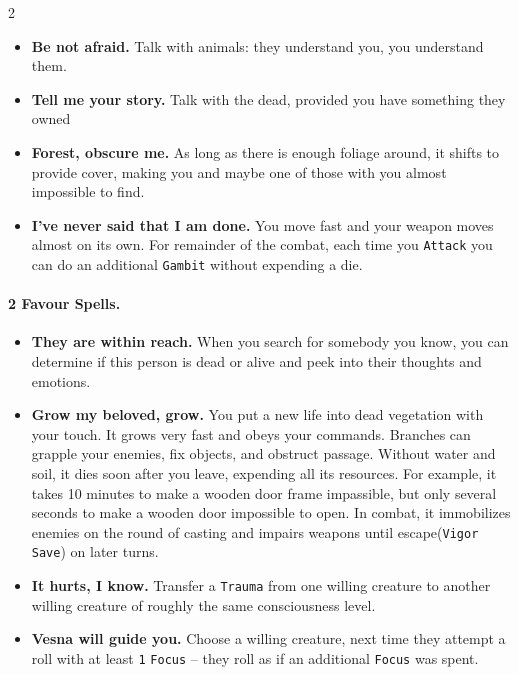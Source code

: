 \documentclass{osr-template/zine}
\begin{document}
\begin{multicols*}{2}
\begin{itemize}[nosep]
    \item[\ding{108}] \textbf{Be not afraid.} Talk with animals: they understand you, you understand them.
    \item[\ding{108}] \textbf{Tell me your story.} Talk with the dead, provided you have something they owned
    \item[\ding{108}] \textbf{Forest, obscure me.} As long as there is enough foliage around, it shifts to provide cover, making you and maybe one of those with you almost impossible to find.
    \item[\ding{108}] \textbf{I've never said that I am done. } You move fast and your weapon moves almost on its own. For remainder of the combat, each time you \texttt{Attack} you can do an additional \texttt{Gambit} without expending a die.
\end{itemize}

\paragraph{2 Favour Spells.}

\begin{itemize}[nosep]
    \item[\ding{108}] \textbf{They are within reach.} When you search for somebody you know, you can determine if this person is dead or alive and peek into their thoughts and emotions.
    \item[\ding{108}] \textbf{Grow my beloved, grow.} You put a new life into dead vegetation with your touch.
 It grows very fast and obeys your commands.
 Branches can grapple your enemies, fix objects, and obstruct passage.
 Without water and soil, it dies soon after you leave, expending all its resources.
 For example, it takes 10 minutes to make a wooden door frame impassible, but only several seconds to make a wooden door impossible to open.
 In combat, it immobilizes enemies on the round of casting and impairs weapons until escape(\texttt{Vigor Save}) on later turns.
    \item[\ding{108}] \textbf{It hurts, I know.} Transfer a \texttt{Trauma} from one willing creature to another willing creature of roughly the same consciousness level.
    \item[\ding{108}] \textbf{Vesna will guide you. } Choose a willing creature, next time they attempt a roll with at least \texttt{1} \texttt{Focus} -- they roll as if an additional \texttt{Focus} was spent.
\end{itemize}


\end{multicols*}
\end{document}
